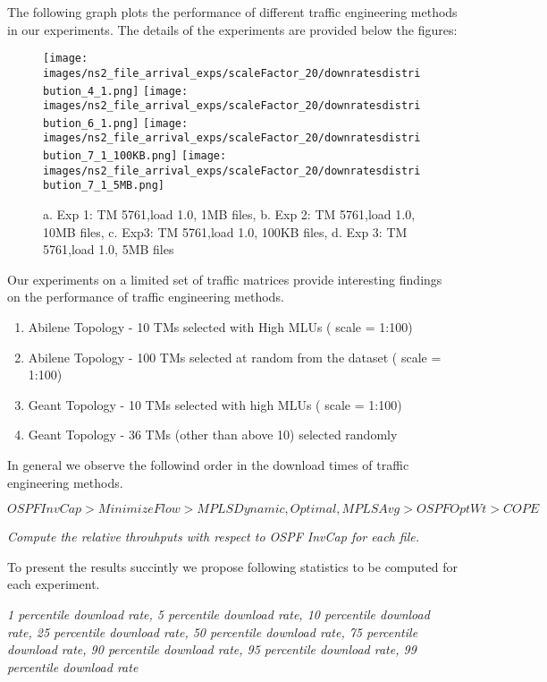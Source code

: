 The following graph plots the performance of different traffic engineering methods in our experiments. The details of the experiments are provided below the figures:


\begin{figure}[ht]

\texttt{[image: images/ns2\_file\_arrival\_exps/scaleFactor\_20/downratesdistribution\_4\_1.png]}
\texttt{[image: images/ns2\_file\_arrival\_exps/scaleFactor\_20/downratesdistribution\_6\_1.png]}
\texttt{[image: images/ns2\_file\_arrival\_exps/scaleFactor\_20/downratesdistribution\_7\_1\_100KB.png]}
\texttt{[image: images/ns2\_file\_arrival\_exps/scaleFactor\_20/downratesdistribution\_7\_1\_5MB.png]}

\caption{a. Exp 1: TM 5761,load 1.0, 1MB files, b. Exp 2: TM 5761,load 1.0, 10MB files, c. Exp3: TM 5761,load 1.0, 100KB files, d. Exp 3: TM 5761,load 1.0, 5MB files}

\label{ x1}
\end{figure}

Our experiments on a limited set of traffic matrices provide interesting findings on the performance of traffic engineering methods. 



\begin{enumerate}
\item 
 Abilene Topology - 10 TMs selected with High MLUs ( scale = 1:100)
\item
 Abilene Topology - 100 TMs selected at random from the dataset ( scale = 1:100)
\item
Geant Topology - 10 TMs selected with high MLUs ( scale = 1:100)
\item
Geant Topology - 36 TMs (other than above 10) selected randomly
\end{enumerate}

In general we observe the followind order in the download times of traffic engineering methods.

\[OSPFInvCap > MinimizeFlow > MPLSDynamic,Optimal,MPLSAvg > OSPF OptWt > COPE\]

\emph{Compute the relative throuhputs with respect to OSPF InvCap for each file.}

To present the results succintly we propose following statistics to be computed for each experiment.

\emph{1 percentile download rate,  5 percentile download rate, 10 percentile download rate, 25 percentile download rate, 50 percentile download rate, 75 percentile download rate, 90 percentile download rate, 95 percentile download rate, 99 percentile download rate}

